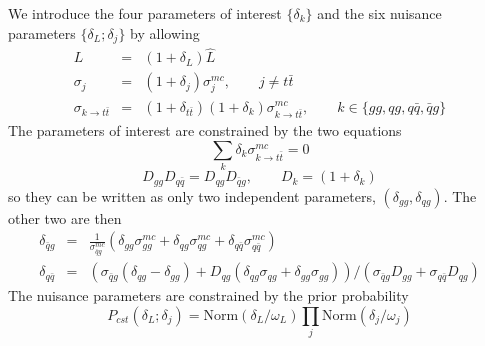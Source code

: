 \documentclass{article}
\begin{document}
We introduce the four parameters of interest $\{\delta_k\}$ and the
six nuisance parameters $\{\delta_L;\delta_j\}$ by allowing
\begin{eqnarray}
  L &=& (1+\delta_L)\hat{L} \\
  \sigma_j &=& (1+\delta_j)\sigma_j^{mc},\qquad j\ne t\bar{t} \\
  \sigma_{k\to t\bar{t}} &=&(1+\delta_{t\bar{t}})(1+\delta_k)\sigma_{k\to t\bar{t}}^{mc},\qquad k\in\{gg,qg,q\bar{q},\bar{q}g\}
\end{eqnarray}
The parameters of interest are constrained by the two equations
\begin{equation}
  \sum_k \delta_k\sigma_{k\to t\bar{t}}^{mc} = 0
\end{equation}
\begin{equation}
  D_{gg}D_{q\bar{q}} = D_{qg}D_{\bar{q}g}, \qquad D_k = (1+\delta_k)
\end{equation}
so they can be written as only two independent parameters,
$(\delta_{gg},\delta_{qg})$.  The other two are then
\begin{eqnarray}
  \delta_{\bar{q}g} &=& \frac{1}{\sigma_{\bar{q}g}^{mc}}\left(\delta_{gg}\sigma_{gg}^{mc}+\delta_{qg}\sigma_{qg}^{mc}+\delta_{q\bar{q}}\sigma_{q\bar{q}}^{mc}\right)\\
  \delta_{q\bar{q}} &=& \left(\sigma_{\bar{q}g}(\delta_{qg}-\delta_{gg}) + D_{qg}(\delta_{qg}\sigma_{qg}+\delta_{gg}\sigma_{gg})\right) / \left(\sigma_{\bar{q}g}D_{gg} + \sigma_{q\bar{q}}D_{qg}\right)
\end{eqnarray}
The nuisance parameters are constrained by the prior probability
\begin{equation}
  P_{cst}(\delta_L;\delta_j) = \mathrm{Norm}(\delta_L/\omega_L)\prod_j\mathrm{Norm}(\delta_j/\omega_j)
\end{equation}
\end{document}
